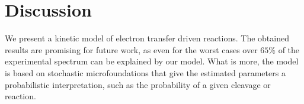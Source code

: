 \documentclass{llncs}
\begin{document}
%
%
\section{Discussion}
        We present a kinetic model of electron transfer driven reactions. The obtained results are promising for future work, as even for the worst cases over $65\%$ of the experimental spectrum can be explained by our model. What is more, the model is based on stochastic microfoundations that give the estimated parameters a probabilistic interpretation, such as the probability of a given cleavage or reaction.
\end{document}
